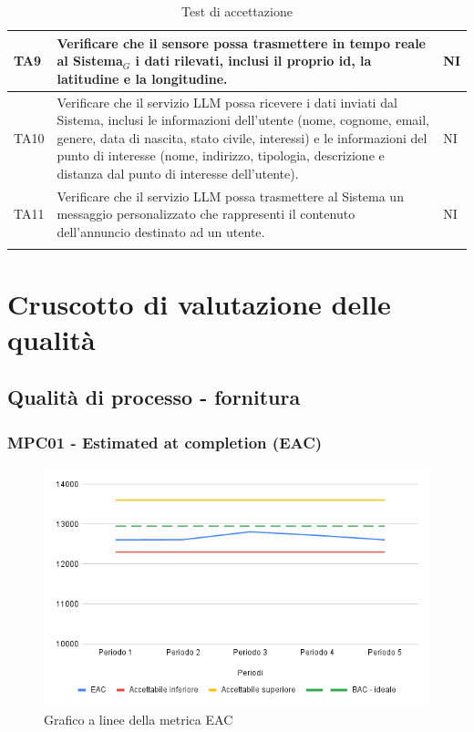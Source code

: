 \documentclass[10pt]{article}
\begin{document}
\begin{justify}
\begin{longtable}{|>{\centering\arraybackslash}m{2cm}|>{\centering\arraybackslash}m{7cm}|>{\centering\arraybackslash}m{2cm}|}
\hline
TA9 & Verificare che il sensore possa trasmettere in tempo reale al Sistema$_G$ i dati rilevati, inclusi il proprio id, la latitudine e la longitudine. & NI \\
\hline
TA10 & Verificare che il servizio LLM possa ricevere i dati inviati dal Sistema, inclusi le informazioni dell'utente (nome, cognome, email, genere, data di nascita, stato civile, interessi) e le informazioni del punto di interesse (nome, indirizzo, tipologia, descrizione e distanza dal punto di interesse dell'utente). & NI \\
\hline
TA11 & Verificare che il servizio LLM possa trasmettere al Sistema un messaggio personalizzato che rappresenti il contenuto dell'annuncio destinato ad un utente. & NI \\
\hline
\caption{Test di accettazione}\\
\end{longtable}


\section{Cruscotto di valutazione delle qualità}
\subsection{Qualità di processo - fornitura}
\label{sec:QdP_fornitura}
\subsubsection{MPC01 - Estimated at completion (EAC)}

\begin{figure}[H]
  \centering
  \includegraphics[width=0.9\linewidth]{EAC.png}
  \caption{Grafico a linee della metrica EAC}
  \label{fig:EACchart}
\end{figure}



\end{justify}
\end{document}
